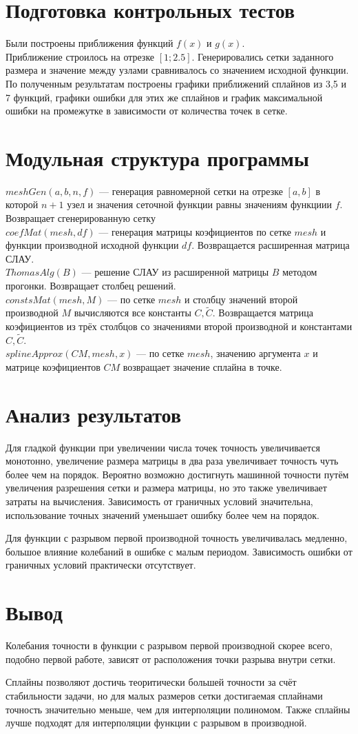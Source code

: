 \documentclass[a4paper]{article}
\begin{document}
\section{Подготовка контрольных тестов}
Были построены приближения функций $f(x)$ и $g(x)$.\\
Приближение строилось на отрезке $[1;2.5]$. Генерировались сетки заданного размера и значение между узлами сравнивалось со значением исходной функции.\\
По полученным результатам построены графики приближений сплайнов из 3,5 и 7 функций, графики ошибки для этих же сплайнов
и график максимальной ошибки на промежутке в зависимости от количества точек в сетке.
\section{Модульная структура программы}
$meshGen(a,b,n,f)$ --- генерация равномерной сетки на отрезке $[a,b]$ в которой $n+1$ узел и значения сеточной функции равны значениям функциии $f$. Возвращает сгенерированную сетку\\
\(coefMat(mesh, df)\) --- генерация матрицы коэфициентов по сетке \(mesh\) и функции производной исходной функции \(df\).
Возвращается расширенная матрица СЛАУ.\\
\(ThomasAlg(B)\) --- решение СЛАУ из расширенной матрицы \(B\) методом прогонки. Возвращает столбец решений.\\
\(constsMat(mesh, M)\) --- по сетке \(mesh\) и столбцу значений второй производной \(M\) вычисляются все константы \(C, \tilde{C}\).
Возвращается матрица коэфициентов из трёх столбцов со значениями второй производной и константами \(C, \tilde{C}\).\\
\(splineApprox(CM,mesh,x)\) --- по сетке \(mesh\), значению аргумента \(x\) и матрице коэфициентов \(CM\) возвращает
значение сплайна в точке.
\section{Анализ результатов}
Для гладкой функции при увеличении числа точек точность увеличивается монотонно, увеличение размера матрицы в два раза
увеличивает точность чуть более чем на порядок. Вероятно возможно достигнуть машинной
точности путём увеличения разрешения сетки и размера матрицы, но это также увеличивает затраты на вычисления. Зависимость от
граничных условий значительна, использование точных значений уменьшает ошибку более чем на порядок.

Для функции с разрывом первой производной точность увеличивалась медленно, большое влияние колебаний в ошибке с малым
периодом. Зависимость ошибки от граничных условий практически отсутствует.
\section{Вывод}
Колебания точности в функции с разрывом первой производной скорее всего, подобно первой работе, зависят от расположения
точки разрыва внутри сетки.

Сплайны позволяют достичь теоритически большей точности за счёт стабильности задачи, но для малых размеров сетки
достигаемая сплайнами точность значительно меньше, чем для интерполяции полиномом. Также сплайны лучше подходят для
интерполяции функции с разрывом в производной.
\end{document}
